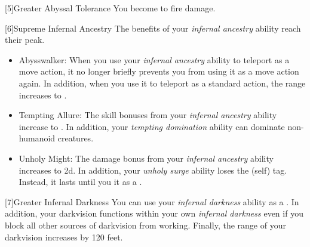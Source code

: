             [5]{Greater Abyssal Tolerance} You become  to fire damage.

            [6]{Supreme Infernal Ancestry} The benefits of your \textit{infernal ancestry} ability reach their peak.
            \begin{itemize}
                \item Abysswalker: When you use your \textit{infernal ancestry} ability to teleport as a move action, it no longer briefly prevents you from using it as a move action again.
                    In addition, when you use it to teleport as a standard action, the range increases to \distrange.
                \item Tempting Allure: The skill bonuses from your \textit{infernal ancestry} ability increase to .
                    In addition, your \textit{tempting domination} ability can dominate non-humanoid creatures.
                \item Unholy Might: The damage bonus from your \textit{infernal ancestry} ability increases to \plus2d.
                    In addition, your \textit{unholy surge} ability loses the  (self) tag.
                    Instead, it lasts until you  it as a .
            \end{itemize}

            [7]{Greater Infernal Darkness} You can use your \textit{infernal darkness} ability as a .
            In addition, your darkvision functions within your own \textit{infernal darkness} even if you block all other sources of darkvision from working.
            Finally, the range of your darkvision increases by 120 feet.



